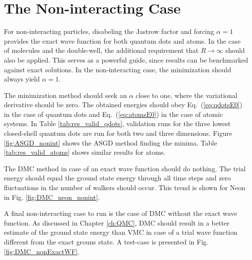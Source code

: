 \section{The Non-interacting Case}

For non-interacting particles, disabeling the Jastrow factor and forcing $\alpha=1$ provides the exact wave function for both quantum dots and atoms. In the case of molecules and the double-well, the additional requirement that $R\to\infty$ should also be applied. This serves as a powerful guide, since results can be benchmarked against exact solutions. In the non-interacting case, the minimization should always yield $\alpha=1$.

The minimization method should seek an $\alpha$ close to one, where the variational derivative should be zero. The obtained energies should obey Eq.~(\ref{eq:qdotsE0}) in the case of quantum dots and Eq.~(\ref{eq:atomsE0}) in the case of atomic systems. In Table \ref{tab:res_valid_qdots}, validation runs for the three lowest closed-shell quantum dots are run for both two and three dimensions. Figure \ref{fig:ASGD_nonint} shows the ASGD method finding the minima. Table \ref{tab:res_valid_atoms} shows similar results for atoms.

The DMC method in case of an exact wave function should do nothing. The trial energy should equal the ground state energy through all time steps and zero fluctuations in the number of walkers should occur. This trend is shown for Neon in Fig. \ref{fig:DMC_neon_nonint}.

A final non-interacting case to run is the case of DMC without the exact wave function. As discussed in Chapter \ref{ch:QMC}, DMC should result in a better estimate of the ground state energy than VMC in case of a trial wave function different from the exact grouns state. A test-case is presented in Fig. \ref{fig:DMC_nonExactWF}.

